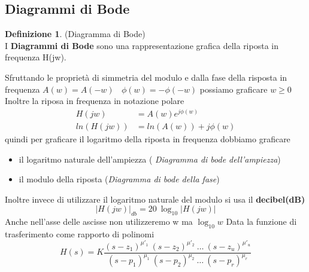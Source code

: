 \documentclass{article}
\theoremstyle{definition}
\newtheorem*{definizione}{Definizione}
\begin{document}
\subsection[Diagrammi]{Diagrammi di Bode}
\begin{definizione}(Diagramma di Bode)\\
	I \textbf{Diagrammi di Bode} sono una rappresentazione grafica della riposta in frequenza H(jw).
\end{definizione}
 Sfruttando le proprietà di simmetria del modulo e dalla fase della risposta in frequenza $A(w)=A(-w)  \ \ \  \ \phi(w)=-\phi(-w)$  possiamo graficare $w \geq 0$ 
 Inoltre la riposa in frequenza in notazione polare 
 \begin{align*}
 	H(jw)&=A(w)e^{j\phi(w)} \\
 	ln(H(jw))&=ln(A(w))+j\phi(w)
 \end{align*}
 quindi per graficare il logaritmo della riposta in frequenza dobbiamo graficare 
 \begin{itemize}
 	\item il logaritmo naturale dell'ampiezza ( \textit{Diagramma di bode dell'ampiezza})
 	\item il modulo della riposta (\textit{Diagramma di bode della fase})
 \end{itemize}
 Inoltre invece di utilizzare il logaritmo naturale del modulo si usa il \textbf{decibel(dB)} 
 $$|H(jw)|_{db}=20\ \log_{10}|H(jw)|$$ Anche nell'asse delle ascisse non utilizzeremo w ma $\log_{10} w$
 Data la funzione di trasferimento come rapporto di polinomi 
 $$H(s)=K\frac{(s-z_1)^{\mu'_1} \ (s-z_2)^{\mu'_2}\ \dots \ (s-z_u)^{\mu'_u}}{(s-p_1)^{\mu_1} \ (s-p_2)^{\mu_2}\ \dots \ (s-p_r)^{\mu_r}}$$
\end{document}
